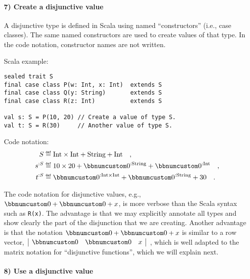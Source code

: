\paragraph{7) Create a disjunctive value}

A disjunctive type is defined in Scala using named \textsf{``}constructors\textsf{''}
(i.e., case classes). The same named constructors are used to create
values of that type. In the code notation, constructor names are not
written.

Scala example:
\begin{lstlisting}
sealed trait S
final case class P(w: Int, x: Int)  extends S
final case class Q(y: String)       extends S
final case class R(z: Int)          extends S

val s: S = P(10, 20) // Create a value of type S.
val t: S = R(30)     // Another value of type S.
\end{lstlisting}
Code notation:
\begin{align*}
S & \triangleq\text{Int}\times\text{Int}+\text{String}+\text{Int}\quad,\\
s^{:S} & \triangleq10\times20+\bbnum 0^{:\text{String}}+\bbnum 0^{:\text{Int}}\quad,\\
t^{:S} & \triangleq\bbnum 0^{:\text{Int}\times\text{Int}}+\bbnum 0^{:\text{String}}+30\quad.
\end{align*}

The code notation for disjunctive values, e.g., $\bbnum 0+\bbnum 0+x$,
is more verbose than the Scala syntax such as \lstinline!R(x)!. The
advantage is that we may explicitly annotate all types and show clearly
the part of the disjunction that we are creating. Another advantage
is that the notation $\bbnum 0+\bbnum 0+x$ is similar to a row vector,
$\,\begin{array}{|ccc|}
\bbnum 0 & \bbnum 0 & x\end{array}$~, which is well adapted to the matrix notation for \textsf{``}disjunctive
functions\textsf{''}, which we will explain next.

\paragraph{8) Use a disjunctive value}

